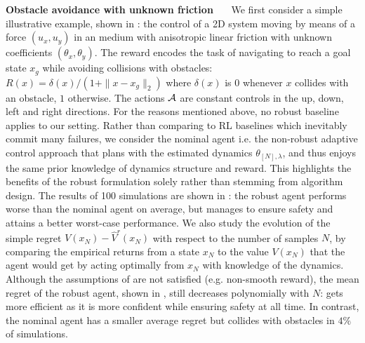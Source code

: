\documentclass{article}
\begin{document}
\textbf{Obstacle avoidance with unknown friction}~~~
We first consider a simple illustrative example, shown in : the control of a 2D system %
moving by means of a force $(u_x, u_y)$ in an medium with anisotropic linear friction with unknown coefficients $(\theta_x, \theta_y)$.
The reward encodes the task of navigating to reach a goal state $x_g$ while avoiding collisions with obstacles: $R(x) = \delta(x)/(1 + \|x - x_g\|_2)$  where $\delta(x)$ is $0$ whenever $x$ collides with an obstacle, $1$ otherwise. The actions $\mathcal{A}$ are constant controls in the up, down, left and right directions.
For the reasons mentioned above, no robust baseline applies to our setting. Rather than comparing  to RL baselines which inevitably commit many failures, we consider the nominal agent i.e. the non-robust adaptive control approach that plans with the estimated dynamics $\theta_{[N],\lambda}$, and thus enjoys the same prior knowledge of dynamics structure and reward. This highlights the benefits of the robust formulation solely rather than stemming from algorithm design.
The results of 100 simulations are shown in : the robust agent performs worse than the nominal agent on average, but manages to ensure safety and attains a better worst-case performance. We also study the evolution of the simple regret $V(x_N) - \hat{V}^r(x_N)$ with respect to the number of samples $N$, by comparing the empirical returns from a state $x_N$ to the value $V(x_N)$ that the agent would get by acting optimally from $x_N$ with knowledge of the dynamics. Although the assumptions of  are not satisfied (e.g. non-smooth reward), the mean regret of the robust agent, shown in , still decreases polynomially with $N$:  gets more efficient as it is more confident while ensuring safety at all time. In contrast, the nominal agent has a smaller average regret but collides with obstacles in $4\%$ of simulations.
\end{document}
